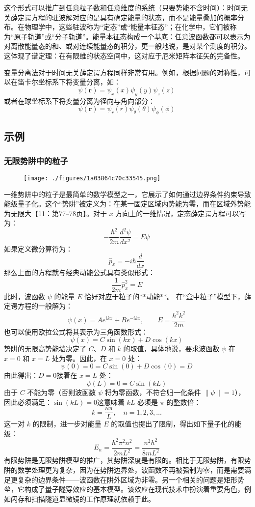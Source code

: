 这个形式可以推广到任意粒子数和任意维度的系统（只要势能不含时间）：时间无关薛定谔方程的驻波解对应的是具有确定能量的状态，而不是能量叠加的概率分布。在物理学中，这些驻波称为“定态”或“能量本征态”；在化学中，它们被称为“原子轨道”或“分子轨道”。能量本征态构成一个基底：任意波函数都可以表示为对离散能量态的和、或对连续能量态的积分，更一般地说，是对某个测度的积分。这体现了谱定理：在有限维的状态空间中，这对应于厄米矩阵本征矢的完备性。

变量分离法对于时间无关薛定谔方程同样非常有用。例如，根据问题的对称性，可以在笛卡尔坐标系下将变量分离，如：
$$
\psi(\mathbf{r}) = \psi_x(x) \psi_y(y) \psi_z(z)~
$$
或者在球坐标系下将变量分离为径向与角向部分：
$$
\psi(\mathbf{r}) = \psi_r(r) \psi_\theta(\theta) \psi_\phi(\phi)~
$$
\subsection{示例}
\subsubsection{无限势阱中的粒子}
\begin{figure}[ht]
\centering
\texttt{[image: ./figures/1a03864c70c33545.png]}
\caption{} \label{fig_XDEfc_3}
\end{figure}
一维势阱中的粒子是最简单的数学模型之一，它展示了如何通过边界条件约束导致能级量子化。这个“势阱”被定义为：在某一固定区域内势能为零，而在区域外势能为无限大【11：第77–78页】。对于 $x$ 方向上的一维情况，定态薛定谔方程可以写为：
$$
-\frac{\hbar^2}{2m} \frac{d^2\psi}{dx^2} = E\psi~
$$
如果定义微分算符为：
$$
\hat{p}_x = -i\hbar \frac{d}{dx}~
$$
那么上面的方程就与经典动能公式具有类似形式：
$$
\frac{1}{2m} \hat{p}_x^2 = E~
$$
此时，波函数 $\psi$ 的能量 $E$ 恰好对应于粒子的**动能**。
在“盒中粒子”模型下，薛定谔方程的一般解为：
$$
\psi(x) = A e^{ikx} + B e^{-ikx}, \quad \quad E = \frac{\hbar^2 k^2}{2m}~
$$
也可以使用欧拉公式将其表示为三角函数形式：
$$
\psi(x) = C \sin(kx) + D \cos(kx)~
$$
势阱的无限高势能墙决定了 $C$、$D$ 和 $k$ 的取值，具体地说，要求波函数 $\psi$ 在 $x = 0$ 和 $x = L$ 处为零。因此，在 $x = 0$ 处：
$$
\psi(0) = 0 = C\sin(0) + D\cos(0) = D~
$$
由此得出：$D = 0$接着在 $x = L$ 处：
$$
\psi(L) = 0 = C\sin(kL)~
$$
由于 $C$ 不能为零（否则波函数 $\psi$ 将为零函数，不符合归一化条件 $\|\psi\| = 1$），因此必须满足：$\sin(kL) = 0$这意味着 $kL$ 必须是 $\pi$ 的整数倍：
$$
k = \frac{n\pi}{L}, \quad n = 1, 2, 3, \dots~
$$
这一对 $k$ 的限制，进一步对能量 $E$ 的取值也提出了限制，得出如下量子化的能级：
$$
E_n = \frac{\hbar^2 \pi^2 n^2}{2mL^2} = \frac{n^2 h^2}{8mL^2}~
$$
有限势阱是无限势阱模型的推广，其势阱深度是有限的。相比于无限势阱，有限势阱的数学处理更为复杂，因为在势阱边界处，波函数不再被强制为零，而是需要满足更复杂的边界条件——波函数在阱外区域为非零。另一个相关的问题是矩形势垒，它构成了量子隧穿效应的基本模型。该效应在现代技术中扮演着重要角色，例如闪存和扫描隧道显微镜的工作原理就依赖于此。
